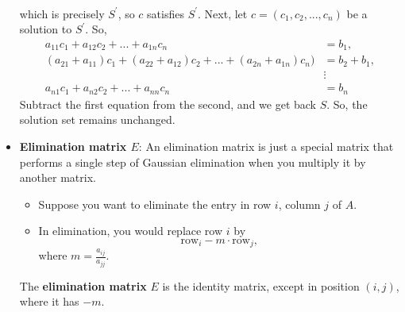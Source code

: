 \documentclass{report}
\begin{document}
\begin{itemize}
\begin{align*}
            \end{align*}
            which is precisely $S^{\prime}$, so $c$ satisfies $ S^{\prime}$. Next, let $c = (c_{1}, c_{2}, ..., c_{n}) $ be a solution to $S^{\prime}$. So,
             \begin{align*}
                a_{11}c_{1} + a_{12}c_{2} + ... + a_{1n}c_{n} &= b_{1},\\
                (a_{21}+a_{11})c_{1} + (a_{22}+a_{12})c_{2} + ... + (a_{2n} + a_{1n})c_{n}) &= b_{2} + b_{1},\\
                                                                                            &\vdots\\
                a_{n1}c_{1} + a_{n2}c_{2} +  ... + a_{nn}c_{n} &= b_{n}
            \end{align*}
            Subtract the first equation from the second, and we get back $S$. So, the solution set remains unchanged.
        \item \textbf{Elimination matrix $E$}: An elimination matrix is just a special matrix that performs a single step of Gaussian elimination when you multiply it by another matrix.
            \begin{itemize}
                \item Suppose you want to eliminate the entry in row $i$, column $j$ of $A$.
                \item In elimination, you would replace row $i$ by
                    \[
                        \text{row}_{i} - m \cdot \text{row}_{j},
                    \]
                    where $m = \tfrac{a_{ij}}{a_{jj}}$.
            \end{itemize}

            The \textbf{elimination matrix} $E$ is the identity matrix, except in position $(i,j)$, where it has $-m$.


\end{itemize}
\end{document}
